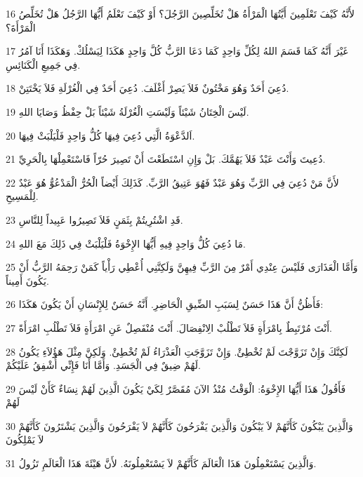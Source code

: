 \par 16 لأَنَّهُ كَيْفَ تَعْلَمِينَ أَيَّتُهَا الْمَرْأَةُ هَلْ تُخَلِّصِينَ الرَّجُلَ؟ أَوْ كَيْفَ تَعْلَمُ أَيُّهَا الرَّجُلُ هَلْ تُخَلِّصُ الْمَرْأَةَ؟
\par 17 غَيْرَ أَنَّهُ كَمَا قَسَمَ اللهُ لِكُلِّ وَاحِدٍ كَمَا دَعَا الرَّبُّ كُلَّ وَاحِدٍ هَكَذَا لِيَسْلُكْ. وَهَكَذَا أَنَا آمُرُ فِي جَمِيعِ الْكَنَائِسِ.
\par 18 دُعِيَ أَحَدٌ وَهُوَ مَخْتُونٌ فَلاَ يَصِرْ أَغْلَفَ. دُعِيَ أَحَدٌ فِي الْغُرْلَةِ فَلاَ يَخْتَتِنْ.
\par 19 لَيْسَ الْخِتَانُ شَيْئاً وَلَيْسَتِ الْغُرْلَةُ شَيْئاً بَلْ حِفْظُ وَصَايَا اللهِ.
\par 20 اَلدَّعْوَةُ الَّتِي دُعِيَ فِيهَا كُلُّ وَاحِدٍ فَلْيَلْبَثْ فِيهَا.
\par 21 دُعِيتَ وَأَنْتَ عَبْدٌ فَلاَ يَهُمَّكَ. بَلْ وَإِنِ اسْتَطَعْتَ أَنْ تَصِيرَ حُرّاً فَاسْتَعْمِلْهَا بِالْحَرِيِّ.
\par 22 لأَنَّ مَنْ دُعِيَ فِي الرَّبِّ وَهُوَ عَبْدٌ فَهُوَ عَتِيقُ الرَّبِّ. كَذَلِكَ أَيْضاً الْحُرُّ الْمَدْعُوُّ هُوَ عَبْدٌ لِلْمَسِيحِ.
\par 23 قَدِ اشْتُرِيتُمْ بِثَمَنٍ فَلاَ تَصِيرُوا عَبِيداً لِلنَّاسِ.
\par 24 مَا دُعِيَ كُلُّ وَاحِدٍ فِيهِ أَيُّهَا الإِخْوَةُ فَلْيَلْبَثْ فِي ذَلِكَ مَعَ اللهِ.
\par 25 وَأَمَّا الْعَذَارَى فَلَيْسَ عِنْدِي أَمْرٌ مِنَ الرَّبِّ فِيهِنَّ وَلَكِنَّنِي أُعْطِي رَأْياً كَمَنْ رَحِمَهُ الرَّبُّ أَنْ يَكُونَ أَمِيناً.
\par 26 فَأَظُنُّ أَنَّ هَذَا حَسَنٌ لِسَبَبِ الضِّيقِ الْحَاضِرِ. أَنَّهُ حَسَنٌ لِلإِنْسَانِ أَنْ يَكُونَ هَكَذَا:
\par 27 أَنْتَ مُرْتَبِطٌ بِامْرَأَةٍ فَلاَ تَطْلُبْ الِانْفِصَالَ. أَنْتَ مُنْفَصِلٌ عَنِ امْرَأَةٍ فَلاَ تَطْلُبِ امْرَأَةً.
\par 28 لَكِنَّكَ وَإِنْ تَزَوَّجْتَ لَمْ تُخْطِئْ. وَإِنْ تَزَوَّجَتِ الْعَذْرَاءُ لَمْ تُخْطِئْ. وَلَكِنَّ مِثْلَ هَؤُلاَءِ يَكُونُ لَهُمْ ضِيقٌ فِي الْجَسَدِ. وَأَمَّا أَنَا فَإِنِّي أُشْفِقُ عَلَيْكُمْ.
\par 29 فَأَقُولُ هَذَا أَيُّهَا الإِخْوَةُ: الْوَقْتُ مُنْذُ الآنَ مُقَصَّرٌ لِكَيْ يَكُونَ الَّذِينَ لَهُمْ نِسَاءٌ كَأَنْ لَيْسَ لَهُمْ
\par 30 وَالَّذِينَ يَبْكُونَ كَأَنَّهُمْ لاَ يَبْكُونَ وَالَّذِينَ يَفْرَحُونَ كَأَنَّهُمْ لاَ يَفْرَحُونَ وَالَّذِينَ يَشْتَرُونَ كَأَنَّهُمْ لاَ يَمْلِكُونَ
\par 31 وَالَّذِينَ يَسْتَعْمِلُونَ هَذَا الْعَالَمَ كَأَنَّهُمْ لاَ يَسْتَعْمِلُونَهُ. لأَنَّ هَيْئَةَ هَذَا الْعَالَمِ تَزُولُ.
